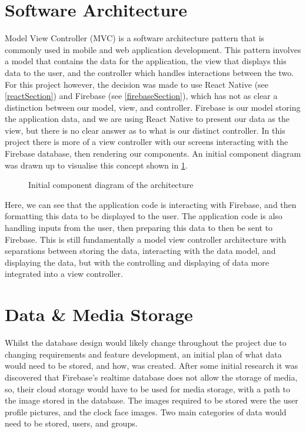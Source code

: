 \section{Software Architecture}
Model View Controller (MVC) \cite{mvc} is a software architecture pattern that is commonly used in mobile and web application development. This pattern involves a model that contains the data for the application, the view that displays this data to the user, and the controller which handles interactions between the two. For this project however, the decision was made to use React Native (see \ref{reactSection}) and Firebase (see \ref{firebaseSection}), which has not as clear a distinction between our model, view, and controller. Firebase is our model storing the application data, and we are using React Native to present our data as the view, but there is no clear answer as to what is our distinct controller. In this project there is more of a view controller with our screens interacting with the Firebase database, then rendering our components. An initial component diagram was drawn up to visualise this concept shown in \ref{fig:compDiag}.
\begin{figure}[!htbp]
    \centering
    \begin{subfigure}[b]{0.6\textwidth}
    \end{subfigure}
    \caption{Initial component diagram of the architecture} 
    \label{fig:compDiag}
\end{figure}
\FloatBarrier
Here, we can see that the application code is interacting with Firebase, and then formatting this data to be displayed to the user. The application code is also handling inputs from the user, then preparing this data to then be sent to Firebase. This is still fundamentally a model view controller architecture with separations between storing the data, interacting with the data model, and displaying the data, but with the controlling and displaying of data more integrated into a view controller.

\section{Data \& Media Storage}\label{dataMedStor}
Whilst the database design would likely change throughout the project due to changing requirements and feature development, an initial plan of what data would need to be stored, and how, was created. After some initial research it was discovered that Firebase's realtime database does not allow the storage of media, so, their cloud storage would have to be used for media storage, with a path to the image stored in the database. The images required to be stored were the user profile pictures, and the clock face images. Two main categories of data would need to be stored, users, and groups.

